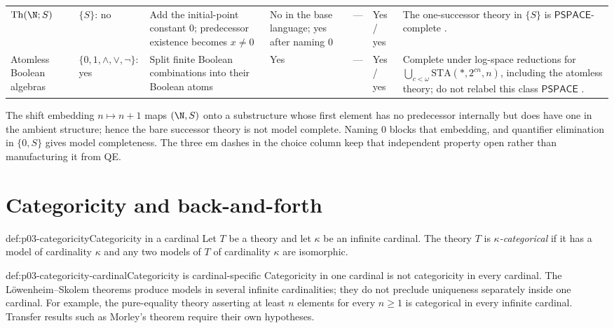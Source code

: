 \begin{landscape}
\begin{longtable}{@{}p{.65in}p{1.10in}p{1.20in}p{.60in}p{.70in}p{.80in}p{2.10in}@{}}
\addlinespace
\(\operatorname{Th}(\N;S)\) & \(\{S\}\): no & Add the initial-point constant \(0\); predecessor existence becomes \(x\ne0\) & No in the base language; yes after naming \(0\) & --- & Yes / yes & The one-successor theory in \(\{S\}\) is \(\mathsf{PSPACE}\)-complete \cite{FerranteRackoff1979}. \\
\addlinespace
Atomless Boolean algebras & \(\{0,1,\wedge,\vee,\neg\}\): yes & Split finite Boolean combinations into their Boolean atoms & Yes & --- & Yes / yes & Complete under log-space reductions for \(\bigcup_{c<\omega}\mathrm{STA}(*,2^{cn},n)\), including the atomless theory; do not relabel this class \(\mathsf{PSPACE}\) \cite{Kozen1980}. \\
\bottomrule
\end{longtable}
\endgroup
\end{landscape}

The shift embedding \(n\mapsto n+1\) maps \((\N,S)\) onto a substructure
whose first element has no predecessor internally but does have one in the
ambient structure; hence the bare successor theory is not model complete.
Naming \(0\) blocks that embedding, and quantifier elimination in
\(\{0,S\}\) gives model completeness.  The three em dashes in the choice
column keep that independent property open rather than manufacturing it from
QE.

\section{Categoricity and back-and-forth}
\label{sec:p03-categoricity-back-and-forth}

\begin{hbdefinition}{def:p03-categoricity}{Categoricity in a cardinal}
Let \(T\) be a theory and let \(\kappa\) be an infinite cardinal.  The theory
\(T\) is \emph{\(\kappa\)-categorical} if it has a model of cardinality
\(\kappa\) and any two models of \(T\) of cardinality \(\kappa\) are
isomorphic.
\end{hbdefinition}

\begin{hbwarning}{def:p03-categoricity-cardinal}{Categoricity is cardinal-specific}
Categoricity in one cardinal is not categoricity in every cardinal.  The
L\"owenheim--Skolem theorems produce models in several infinite cardinalities;
they do not preclude uniqueness separately inside one cardinal.  For example,
the pure-equality theory asserting at least \(n\) elements for every
\(n\geq1\) is categorical in every infinite cardinal.  Transfer results such
as Morley's theorem require their own hypotheses.
\end{hbwarning}

